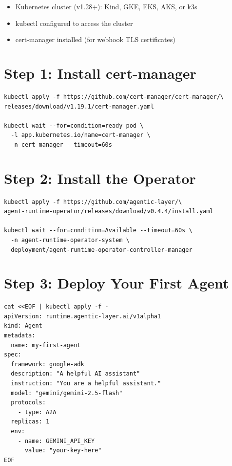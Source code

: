 \documentclass[12pt,a4paper,openany]{report}
\begin{document}
\begin{itemize}
    \item Kubernetes cluster (v1.28+): Kind, GKE, EKS, AKS, or k3s
    \item kubectl configured to access the cluster
    \item cert-manager installed (for webhook TLS certificates)
\end{itemize}

\section{Step 1: Install cert-manager}

\begin{lstlisting}[style=bash, caption={Install cert-manager}]
kubectl apply -f https://github.com/cert-manager/cert-manager/\
releases/download/v1.19.1/cert-manager.yaml

kubectl wait --for=condition=ready pod \
  -l app.kubernetes.io/name=cert-manager \
  -n cert-manager --timeout=60s
\end{lstlisting}

\section{Step 2: Install the Operator}

\begin{lstlisting}[style=bash, caption={Install AgentK operator}]
kubectl apply -f https://github.com/agentic-layer/\
agent-runtime-operator/releases/download/v0.4.4/install.yaml

kubectl wait --for=condition=Available --timeout=60s \
  -n agent-runtime-operator-system \
  deployment/agent-runtime-operator-controller-manager
\end{lstlisting}

\section{Step 3: Deploy Your First Agent}

\begin{lstlisting}[style=bash, caption={Deploy a simple agent}]
cat <<EOF | kubectl apply -f -
apiVersion: runtime.agentic-layer.ai/v1alpha1
kind: Agent
metadata:
  name: my-first-agent
spec:
  framework: google-adk
  description: "A helpful AI assistant"
  instruction: "You are a helpful assistant."
  model: "gemini/gemini-2.5-flash"
  protocols:
    - type: A2A
  replicas: 1
  env:
    - name: GEMINI_API_KEY
      value: "your-key-here"
EOF
\end{lstlisting}
\end{document}
